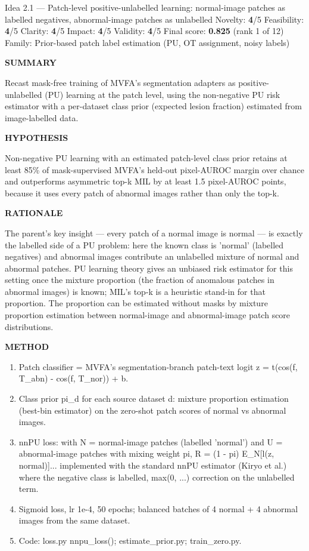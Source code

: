 \documentclass[11pt,a4paper]{article}
\newcommand{\lbl}[1]{{\sffamily\footnotesize\bfseries\color{muted}\MakeUppercase{#1}}\par}
\begin{document}
\begin{ideabox}{Idea 2.1 — Patch-level positive-unlabelled learning: normal-image patches as labelled negatives, abnormal-image patches as unlabelled}
{\small Novelty: \textbf{4}/5 \quad Feasibility: \textbf{4}/5 \quad Clarity: \textbf{4}/5 \quad Impact: \textbf{4}/5 \quad Validity: \textbf{4}/5 \quad Final score: \textbf{0.825} (rank 1 of 12) \quad Family: Prior-based patch label estimation (PU, OT assignment, noisy labels)}\par\smallskip
\lbl{Summary}Recast mask-free training of MVFA's segmentation adapters as positive-unlabelled (PU) learning at the patch level, using the non-negative PU risk estimator with a per-dataset class prior (expected lesion fraction) estimated from image-labelled data.

\lbl{Hypothesis}Non-negative PU learning with an estimated patch-level class prior retains at least 85\% of mask-supervised MVFA's held-out pixel-AUROC margin over chance and outperforms asymmetric top-k MIL by at least 1.5 pixel-AUROC points, because it uses every patch of abnormal images rather than only the top-k.

\lbl{Rationale}The parent's key insight — every patch of a normal image is normal — is exactly the labelled side of a PU problem: here the known class is 'normal' (labelled negatives) and abnormal images contribute an unlabelled mixture of normal and abnormal patches. PU learning theory gives an unbiased risk estimator for this setting once the mixture proportion (the fraction of anomalous patches in abnormal images) is known; MIL's top-k is a heuristic stand-in for that proportion. The proportion can be estimated without masks by mixture proportion estimation between normal-image and abnormal-image patch score distributions.

\lbl{Method}\begin{enumerate}[leftmargin=1.6em,itemsep=1pt,topsep=2pt]
\item Patch classifier = MVFA's segmentation-branch patch-text logit z = t(cos(f, T\_\allowbreak{}abn) - cos(f, T\_\allowbreak{}nor)) + b.
\item Class prior pi\_\allowbreak{}d for each source dataset d: mixture proportion estimation (best-bin estimator) on the zero-shot patch scores of normal vs abnormal images.
\item nnPU loss: with N = normal-image patches (labelled 'normal') and U = abnormal-image patches with mixing weight pi, R = (1 - pi) E\_\allowbreak{}N[l(z, normal)]... implemented with the standard nnPU estimator (Kiryo et al.) where the negative class is labelled, max(0, ...) correction on the unlabelled term.
\item Sigmoid loss, lr 1e-4, 50 epochs; balanced batches of 4 normal + 4 abnormal images from the same dataset.
\item Code: loss.py nnpu\_\allowbreak{}loss(); estimate\_\allowbreak{}prior.py; train\_\allowbreak{}zero.py.
\end{enumerate}


\end{ideabox}
\end{document}
